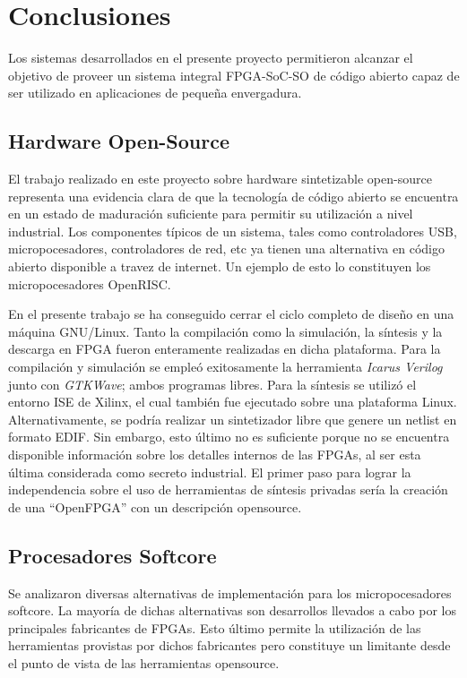 
\chapter{Conclusiones}
Los sistemas desarrollados en el presente proyecto permitieron alcanzar el objetivo de proveer un sistema integral FPGA-SoC-SO de código abierto capaz de ser utilizado en aplicaciones de pequeña envergadura. 

\section{Hardware Open-Source}

El trabajo realizado en este proyecto sobre hardware sintetizable open-source representa una evidencia clara de que la tecnología de código abierto se encuentra en un estado de maduración suficiente para permitir su utilización a nivel industrial. Los componentes típicos de un sistema, tales como controladores USB, micropocesadores, controladores de red, etc ya tienen una alternativa en código abierto disponible a travez de internet. Un ejemplo de esto lo constituyen los micropocesadores OpenRISC.

En el presente trabajo se ha conseguido cerrar el ciclo completo de diseño en una máquina GNU/Linux. Tanto la compilación como la simulación, la síntesis y la descarga en FPGA fueron enteramente realizadas en dicha plataforma. Para la compilación y simulación se empleó exitosamente la herramienta \textit{Icarus Verilog} junto con \textit{GTKWave}; ambos programas libres. Para la síntesis se utilizó el entorno ISE de Xilinx, el cual también fue ejecutado sobre una plataforma Linux. Alternativamente, se podría realizar un sintetizador libre que genere un netlist en formato EDIF. Sin embargo, esto último no es suficiente porque no se encuentra disponible información sobre los detalles internos de las FPGAs, al ser esta última considerada como secreto industrial. El primer paso para lograr la independencia sobre el uso de herramientas de síntesis privadas sería la creación de una ``OpenFPGA'' con un descripción opensource.

\section{Procesadores Softcore}

Se analizaron diversas alternativas de implementación para los micropocesadores softcore. La mayoría de dichas alternativas son desarrollos llevados a cabo por los principales fabricantes de FPGAs. Esto último permite la utilización de las herramientas provistas por dichos fabricantes pero constituye un limitante desde el punto de vista de las herramientas opensource.

